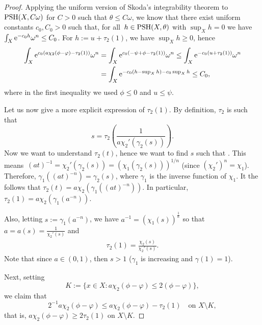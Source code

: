 \documentclass[11pt]{article}
\numberwithin{equation}{section}
\numberwithin{equation}{section}
\theoremstyle{plain}
\newcommand \PSH {{\rm PSH}}
\begin{document}
\begin{proof}
Applying the uniform version of Skoda's integrability theorem \cite{Zer01} to $\PSH(X,C\omega)$ for ${C>0}$ such that $\theta\leq C\omega$, we know that there exist uniform constants $c_0, C_0>0$ such that, for all~${h \in \PSH(X,\theta)}$ with $\sup_X h=0$ we have $\int_X {\rm e}^{-c_0 h} \omega^n \leq C_0$. For $h:=u+\tau_2(1)$, we have $\sup_X h \geq 0$, hence
\begin{align*}%
 \int_X {\rm e}^{c_0 (a \chi_2(\phi-\varphi) -\tau_2(1))} \omega^n &= \int_X {\rm e}^{c_0 (-\psi+\phi -\tau_2(1))} \omega^n \leq \int_X {\rm e}^{-c_0 (u +\tau_2(1))} \omega^n
\\&= \int_X {\rm e}^{-c_0 (h-\sup_X h) - c_0\sup_X h} \leq C_0,
\end{align*}
where in the first inequality we used $\phi\leq 0$ and $u\leq \psi$.

Let us now give a more explicit expression of $\tau_2(1)$.
By definition, $\tau_2$ is such that
\[s=\tau_2 \left( \frac{1}{a\chi_2'(\gamma_2(s))} \right).\] Now we want to understand $\tau_2(t)$, hence we want to find $s$ such that . This means~${ (at)^{-1}=\chi_2'(\gamma_2(s)) = (\chi_1(\gamma_2(s)))^{1/n} }$ (since $(\chi_2')^n=\chi_1$). Therefore, $\gamma_1((at)^{-n}) =\gamma_2(s)$, where $\gamma_1$ is the inverse function of $\chi_1$. It the follows that $ \tau_2(t)= a\chi_2(\gamma_1((at)^{-n}))$.
In particular, $\tau_2(1)= a\chi_2(\gamma_1(a^{-n}))$.

Also, letting $s:=\gamma_1 (a^{-n})$, we have $a^{-1} = (\chi_1(s))^{\frac{1}{n}}$ so that $a=a(s) = \frac{1}{\chi_2'(s)}$ and
\begin{gather} \tau_2(1) = \frac{\chi_2(s)}{\chi_2'(s)}. \label{Bo} \end{gather}
Note that since $a\in(0,1)$, then $s > 1$ ($\gamma_1$ is increasing and $\gamma(1)=1$).

Next, setting \[K:= \{ x \in X \colon a \chi_2(\phi - \varphi) \leq 2(\phi - \varphi) \},\]
we claim that
\[2^{-1} a \chi_2(\phi - \varphi) \leq a \chi_2(\phi - \varphi) - \tau_2(1) \quad \text{on $X \setminus K$},\]
that is, $a \chi_2(\phi - \varphi) \geq 2 \tau_2(1)$ on $X \setminus K$.


\end{proof}
\end{document}
